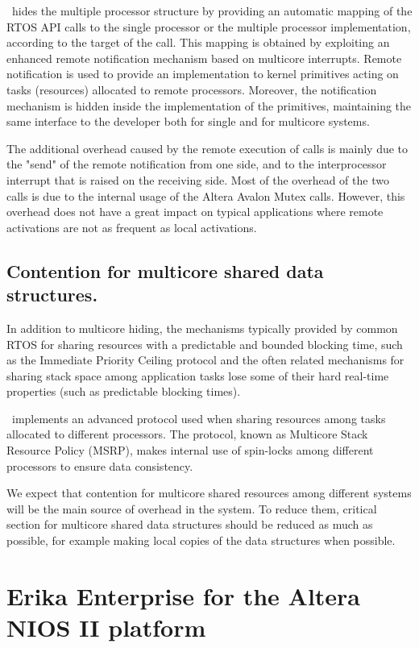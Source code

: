\ee\ hides the multiple processor structure by providing an automatic
mapping of the RTOS API calls to the single processor or the multiple
processor implementation, according to the target of the call. This
mapping is obtained by exploiting an enhanced remote notification
mechanism based on multicore interrupts. Remote notification is
used to provide an implementation to kernel primitives acting on tasks
(resources) allocated to remote processors. Moreover, the notification
mechanism is hidden inside the implementation of the \ee primitives,
maintaining the same interface to the developer both for single and
for multicore systems.

The additional overhead caused by the remote execution of calls is
mainly due to the "send" of the remote notification from one side, and
to the interprocessor interrupt that is raised on the receiving
side. Most of the overhead of the two calls is due to the internal
usage of the Altera Avalon Mutex calls. However, this overhead does
not have a great impact on typical applications where remote
activations are not as frequent as local activations.  

\subsection{Contention for multicore shared data structures.}

In addition to multicore hiding, the mechanisms typically
provided by common RTOS for sharing resources with a predictable and
bounded blocking time, such as the Immediate Priority Ceiling protocol
and the often related mechanisms for sharing stack space among
application tasks lose some of their hard real-time properties (such
as predictable blocking times).

\ee\ implements an advanced protocol used when sharing
resources among tasks allocated to different processors. The protocol,
known as Multicore Stack Resource Policy (MSRP), makes internal
use of spin-locks among different processors to ensure data
consistency. 

We expect that contention for multicore shared resources among
different systems will be the main source of overhead in the
system. To reduce them, critical section for multicore shared
data structures should be reduced as much as possible, for example
making local copies of the data structures when possible.


\section{Erika Enterprise for the Altera NIOS II platform}

